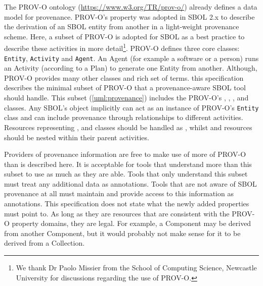 {The PROV-O ontology (\url{https://www.w3.org/TR/prov-o/}) already defines a data model for provenance. PROV-O's  property was adopted in SBOL 2.x to describe the derivation of an SBOL entity from another in a light-weight provenance scheme.  Here, a subset of PROV-O is adopted for SBOL as a best practice to describe these activities in more detail\footnote{We thank Dr Paolo Missier from the School of Computing Science, Newcastle University for discussions regarding the use of PROV-O.}. PROV-O defines three core classes: \texttt{Entity}, \texttt{Activity} and \texttt{Agent}. An Agent (for example a software or a person) runs an Activity (according to a Plan) to generate one Entity from another. Although, PROV-O provides many other classes and rich set of terms. this specification describes the minimal subset of PROV-O that a provenance-aware SBOL tool should handle. This subset (\ref{uml:provenance}) includes the PROV-O's , , ,  and  classes. Any SBOL's  object implicitly can act as an instance of PROV-O's \texttt{Entity} class and can include provenance through relationships to different activities. Resources representing ,  and  classes should be handled as , whilst  and  resources should be nested within their parent activities. 


Providers of provenance information are free to make use of more of PROV-O than is described here. It is acceptable for tools that understand more than this subset to use as much as they are able. Tools that only understand this subset must treat any additional data as annotations. Tools that are not aware of SBOL provenance at all must maintain and provide access to this information as annotations. This specification does not state what the newly added properties must point to. As long as they are resources that are consistent with the PROV-O property domains, they are legal. For example, a Component may be derived from another Component, but it would probably not make sense for it to be derived from a Collection.
}

